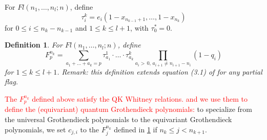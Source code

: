 \documentclass[12pt]{amsart}
\newtheorem{mydef}[thm]{\bf Definition}
\theoremstyle{remark}
\begin{document}
For $Fl(n_1, \dots, n_l; n)$, define 
\[
    \tau_i^k = e_i(1-x_{n_{k-1} + 1}, \dots, 1-x_{n_k})
\]
for $0 \leq i \leq n_k - n_{k-1}$ and $1 \leq k \leq l + 1$, with $\tau_0^{\ast} = 0$.

\begin{mydef}\label{$F_p^{n_k}$}
For $Fl(n_1, \dots, n_l; n)$, define
\[
F_p^{n_k} = \sum\limits_{a_1 + \dots + a_k = p} \tau_{a_1}^1 \cdot \dots \cdot \tau_{a_k}^k \prod\limits_{a_i > \, 0, \, a_{i+1} \neq n_{i+1} - n_i} (1-q_i)
\]
for $1 \leq k \leq l+1$. Remark: this definition extends equation (3.1) of \cite{lm} for any partial flag.
\end{mydef}


\textcolor{red}{The $F_p^{n_k}$ defined above satisfy the QK Whitney relations.
and we use them to define the (equivariant) quantum Grothendieck polynomials:} to specialize from the universal Grothendieck polynomials to the equivariant Grothendieck polynomials, we set $c_{j, i}$ to the $F_j^{n_k}$ defined in \ref{$F_p^{n_k}$} if $n_k \leq j < n_{k+1}$.
\end{document}
